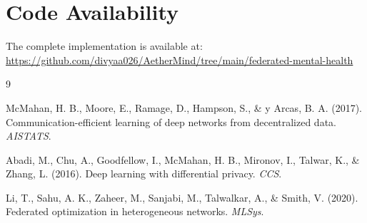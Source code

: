 \documentclass[11pt,a4paper]{article}
\begin{document}
\section*{Code Availability}

The complete implementation is available at: \url{https://github.com/divyaa026/AetherMind/tree/main/federated-mental-health}


\begin{thebibliography}{9}

McMahan, H. B., Moore, E., Ramage, D., Hampson, S., \& y Arcas, B. A. (2017).
Communication-efficient learning of deep networks from decentralized data.
\textit{AISTATS}.

Abadi, M., Chu, A., Goodfellow, I., McMahan, H. B., Mironov, I., Talwar, K., \& Zhang, L. (2016).
Deep learning with differential privacy.
\textit{CCS}.

Li, T., Sahu, A. K., Zaheer, M., Sanjabi, M., Talwalkar, A., \& Smith, V. (2020).
Federated optimization in heterogeneous networks.
\textit{MLSys}.

\end{thebibliography}
\end{document}
